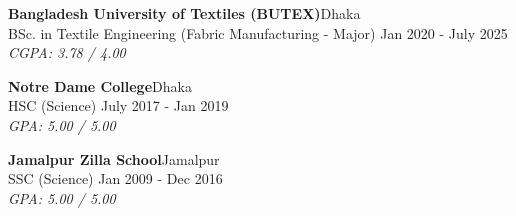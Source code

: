 
      \vspace{2mm}
      \textbf{Bangladesh University of Textiles (BUTEX)}\hfill Dhaka\\
      \vspace{1mm}
      BSc. in Textile Engineering (Fabric Manufacturing - Major) \hfill Jan 2020 - July 2025\\
      \vspace{1mm}
      {\sl CGPA: 3.78 / 4.00}\\
      \vspace{3mm}

      \textbf{Notre Dame College}\hfill Dhaka\\
      \vspace{1mm}
      HSC (Science) \hfill July 2017 - Jan 2019\\
       \vspace{1mm}
      {\sl GPA: 5.00 / 5.00}\\
      \vspace{3mm}

      \textbf{Jamalpur Zilla School}\hfill Jamalpur\\
      \vspace{1mm}
       SSC (Science) \hfill Jan 2009 - Dec 2016\\
      \vspace{1mm}
      {\sl GPA: 5.00 / 5.00}\\
      
\vspace{5mm}